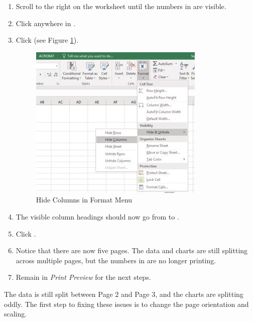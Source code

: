 \begin{enumbox}
	\begin{enumerate}
		\item Scroll to the right on the worksheet until the numbers in  are visible.
		\item Click anywhere in .
		\item Click  (see Figure \ref{04:fig52}).
		
		\begin{figure}[H]
			\centering
			\includegraphics[width=\maxwidth{.95\linewidth}]{gfx/ch04_fig52}
			\caption{Hide Columns in Format Menu}
			\label{04:fig52}
		\end{figure}
			
		\item The visible column headings should now go from  to .
		\item Click .
		\item Notice that there are now five pages. The data and charts are still splitting across multiple pages, but the numbers in  are no longer printing.
		\item Remain in \textit{Print Preview} for the next steps.
	\end{enumerate}
\end{enumbox}

The data is still split between Page $ 2 $ and Page $ 3 $, and the charts are splitting oddly. The first step to fixing these issues is to change the page orientation and scaling.

